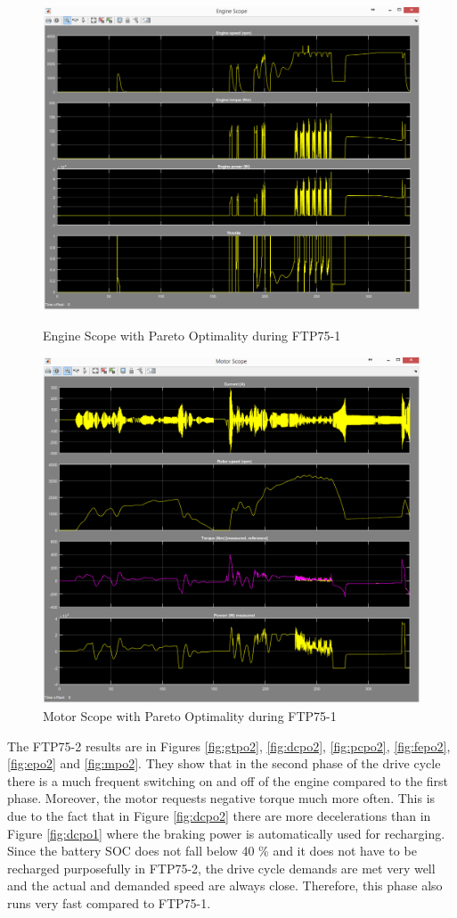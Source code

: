 \begin{figure}[hp]
\centering
\includegraphics[scale=0.42]{figures/Pareto/FTP75-1/engine30Juni}
\caption{Engine Scope with Pareto Optimality during FTP75-1}
\label{fig:epo1}
\includegraphics[scale=0.42]{figures/Pareto/FTP75-1/motor30Juni}
\caption{Motor Scope with Pareto Optimality during FTP75-1}
\label{fig:mpo1}
\end{figure}

The FTP75-2 results are in Figures \ref{fig:gtpo2}, \ref{fig:dcpo2}, \ref{fig:pcpo2}, \ref{fig:fepo2}, \ref{fig:epo2} and \ref{fig:mpo2}. They show that in the second phase of the drive cycle there is a much frequent switching on and off of the engine compared to the first phase. Moreover, the motor requests negative torque much more often. This is due to the fact that in Figure \ref{fig:dcpo2} there are more decelerations than in Figure \ref{fig:dcpo1} where the braking power is automatically used for recharging. Since the battery SOC does not fall below 40 \% and it does not have to be recharged purposefully in FTP75-2, the drive cycle demands are met very well and the actual and demanded speed are always close. Therefore, this phase also runs very fast compared to FTP75-1.

